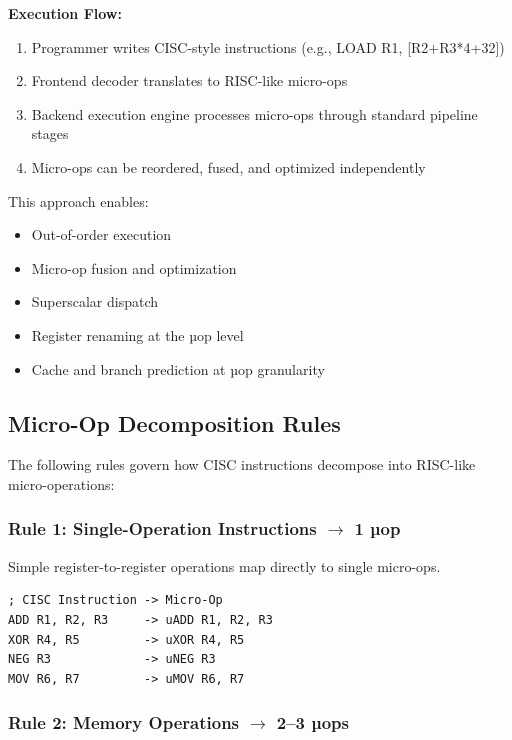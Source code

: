 \documentclass[12pt]{article}
\begin{document}
\textbf{Execution Flow:}

\begin{enumerate}
    \item Programmer writes CISC-style instructions (e.g., LOAD R1, [R2+R3*4+32])
    \item Frontend decoder translates to RISC-like micro-ops
    \item Backend execution engine processes micro-ops through standard pipeline stages
    \item Micro-ops can be reordered, fused, and optimized independently
\end{enumerate}

This approach enables:
\begin{itemize}
    \item Out-of-order execution
    \item Micro-op fusion and optimization
    \item Superscalar dispatch
    \item Register renaming at the µop level
    \item Cache and branch prediction at µop granularity
\end{itemize}

\subsection{Micro-Op Decomposition Rules}

The following rules govern how CISC instructions decompose into RISC-like micro-operations:

\subsubsection{Rule 1: Single-Operation Instructions $\rightarrow$ 1 µop}

Simple register-to-register operations map directly to single micro-ops.

\begin{lstlisting}
; CISC Instruction -> Micro-Op
ADD R1, R2, R3     -> uADD R1, R2, R3
XOR R4, R5         -> uXOR R4, R5
NEG R3             -> uNEG R3
MOV R6, R7         -> uMOV R6, R7
\end{lstlisting}

\subsubsection{Rule 2: Memory Operations $\rightarrow$ 2--3 µops}
\end{document}
